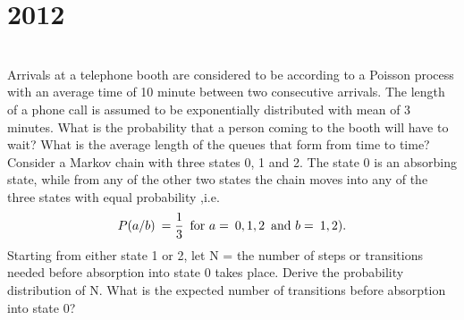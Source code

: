 \section*{2012}
\vspace{-.5cm}
\hrulefill \smallskip\\
 Arrivals at a telephone booth are considered to be according to a Poisson process with an average time of 10 minute between two consecutive arrivals. The length of a phone call is assumed to be exponentially distributed with mean of 3 minutes. What is the probability that a person coming to the booth will have to wait? What is the average length of the queues that form from time to time?
\myline
{} Consider a Markov chain with three states 0, 1 and 2. The state 0 is an absorbing state, while from any of the other two states the chain moves into any of the three states with equal probability ,i.e.
\[ P(a/b) \:= \frac{1}{3} \enskip \text{for } a=\:0,1,2 \enskip \text{and } b= \:1,2). 
\]
Starting from either state 1 or 2, let N = the number of steps or transitions needed before absorption into state 0 takes place. Derive the probability distribution of N. What is the expected number of transitions before absorption into state 0?